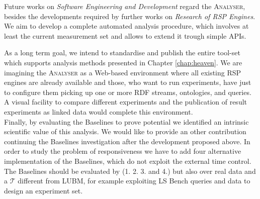 \noindent Future works on \textit{Software Engineering and Development} regard the \textsc{Analyser}, besides the developments required by   further works on \textit{Research of RSP Engines}.  We aim to develop a complete automated analysis procedure, which involves at least the current measurement set and allows to extend it trough simple APIs. 


As a long term goal, we intend to standardise and publish the entire tool-set which supports analysis methods presented in Chapter \ref{chap:heaven}. We are imagining the \textsc{Analyser} as a Web-based environment where all existing RSP engines are already available and those, who want to run experiments, have just to configure them picking up one or more RDF streams, ontologies, and queries. A visual facility to compare different experiments and the publication of result experiments as linked data would complete this environment. \\


\noindent Finally, by evaluating the Baselines to prove \name potential we identified an intrinsic scientific value of this analysis. We would like to provide an other contribution continuing the Baselines investigation after the development proposed above. In order to study the problem of responsiveness we have to add four alternative implementation of the Baselines, which do not exploit the external time control. The Baselines should be evaluated by (1. 2. 3. and 4.) but also over real data and a $\mathcal{T}$ different from LUBM, for example exploiting LS Bench queries and data to design an experiment set. 

